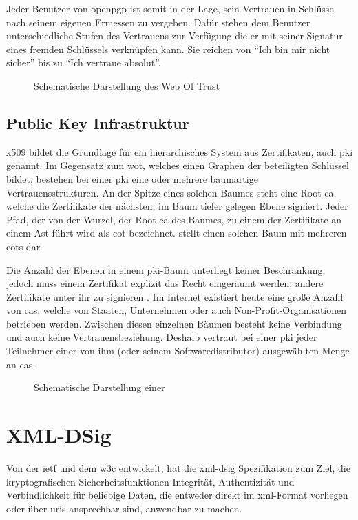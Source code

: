 Jeder Benutzer von \gls{openpgp} ist somit in der Lage, sein Vertrauen in Schlüssel nach seinem eigenen Ermessen zu vergeben. Dafür stehen dem
Benutzer unterschiedliche Stufen des Vertrauens zur Verfügung die er mit seiner Signatur eines fremden Schlüssels verknüpfen kann. Sie reichen von "`Ich bin mir
nicht sicher"' bis zu "`Ich vertraue absolut"'.

\begin{figure}
\centering

\caption{Schematische Darstellung des Web Of Trust}
\label{fig:wot}
\end{figure}

\subsection{Public Key Infrastruktur}
\gls{x509} bildet die Grundlage für ein hierarchisches System aus Zertifikaten, auch \gls{pki} genannt. Im Gegensatz zum \gls{wot}, welches einen Graphen der
beteiligten Schlüssel bildet, bestehen bei einer \gls{pki} eine oder mehrere baumartige Vertrauensstrukturen.
An der Spitze eines solchen Baumes steht eine Root-\gls{ca}, welche die Zertifikate der nächsten, im Baum tiefer gelegen Ebene signiert. Jeder Pfad, der von der
Wurzel, der Root-\gls{ca} des Baumes, zu einem der Zertifikate an einem Ast führt wird als \gls{cot} bezeichnet.  stellt einen solchen Baum mit
mehreren \glspl{cot} dar.

Die Anzahl der Ebenen in einem \gls{pki}-Baum unterliegt keiner Beschränkung, jedoch muss einem Zertifikat explizit das Recht eingeräumt werden, andere
Zertifikate unter ihr zu signieren \cite{kits}. Im Internet existiert heute eine große Anzahl von \glspl{ca}, welche von Staaten, Unternehmen oder auch
Non-Profit-Organisationen betrieben werden. Zwischen diesen einzelnen Bäumen besteht keine Verbindung und auch keine Vertrauensbeziehung. Deshalb vertraut bei
einer \gls{pki} jeder Teilnehmer einer von ihm (oder seinem Softwaredistributor) ausgewählten Menge an \glspl{ca}. \cite{ssliverse:eff}

\begin{figure}
\centering

\caption{Schematische Darstellung einer \texorpdfstring{\protect{}}{PKI}}
\label{fig:cot}
\end{figure}

\section{XML-DSig}
\label{sec:GrundlagenDefinitionen:xml-dsig}
Von der \gls{ietf} und dem \gls{w3c} entwickelt, hat die \gls{xml-dsig} Spezifikation zum Ziel, die kryptografischen Sicherheitsfunktionen Integrität,
Authentizität und Verbindlichkeit für beliebige Daten, die entweder direkt im \gls{xml}-Format vorliegen oder über \glspl{uri} ansprechbar sind, anwendbar zu
machen. \cite{xml-dsig:w3c}

